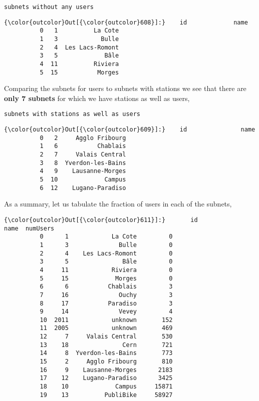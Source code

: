 \documentclass{report}
\begin{document}
    \begin{Verbatim}[commandchars=\\\{\}]
subnets without any users
    \end{Verbatim}

            \begin{Verbatim}[commandchars=\\\{\}]
{\color{outcolor}Out[{\color{outcolor}608}]:}    id             name
          0   1          La Cote
          1   3            Bulle
          2   4  Les Lacs-Romont
          3   5             Bâle
          4  11          Riviera
          5  15           Morges
\end{Verbatim}
        
    Comparing the subnets for users to subnets with stations we see that
there are \textbf{only 7 subnets} for which we have stations as well as
users,


    \begin{Verbatim}[commandchars=\\\{\}]
subnets with stations as well as users
    \end{Verbatim}

            \begin{Verbatim}[commandchars=\\\{\}]
{\color{outcolor}Out[{\color{outcolor}609}]:}    id               name
          0   2     Agglo Fribourg
          1   6           Chablais
          2   7     Valais Central
          3   8  Yverdon-les-Bains
          4   9    Lausanne-Morges
          5  10             Campus
          6  12    Lugano-Paradiso
\end{Verbatim}
        
    As a summary, let us tabulate the fraction of users in each of the
subnets,



            \begin{Verbatim}[commandchars=\\\{\}]
{\color{outcolor}Out[{\color{outcolor}611}]:}       id               name  numUsers
          0      1            La Cote         0
          1      3              Bulle         0
          2      4    Les Lacs-Romont         0
          3      5               Bâle         0
          4     11            Riviera         0
          5     15             Morges         0
          6      6           Chablais         3
          7     16              Ouchy         3
          8     17           Paradiso         3
          9     14              Vevey         4
          10  2011            unknown       152
          11  2005            unknown       469
          12     7     Valais Central       530
          13    18               Cern       721
          14     8  Yverdon-les-Bains       773
          15     2     Agglo Fribourg       810
          16     9    Lausanne-Morges      2183
          17    12    Lugano-Paradiso      3425
          18    10             Campus     15871
          19    13          PubliBike     58927
\end{Verbatim}
        
\end{document}
